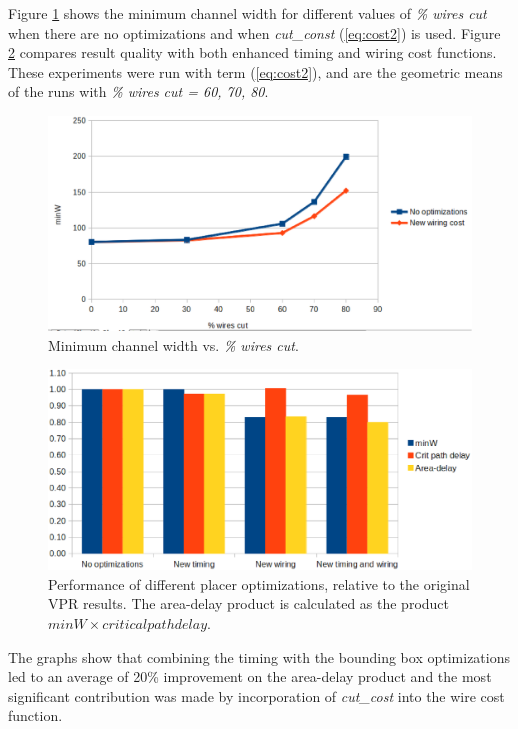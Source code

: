 \documentclass{sig-alternate-2013}
\begin{document}
Figure \ref{fig:comparison_minW} shows the minimum channel width for different values of \textit{\% wires cut} when there are no optimizations and when \textit{cut\_const} (\ref{eq:cost2}) is used. %
Figure \ref{fig:comparison_bars} compares result quality with both enhanced timing and wiring cost functions. These experiments were run with term (\ref{eq:cost2}), and are the geometric means of the runs with \textit{\% wires cut = 60, 70, 80}. 

\begin{figure}[!htbp]
\centering
\includegraphics[width=\linewidth]{comparison_minW.eps}
\caption{Minimum channel width vs. \textit{\% wires cut}.}
\label{fig:comparison_minW}
\end{figure}

\begin{figure}[!htbp]
\centering
\includegraphics[width=\linewidth]{comparison_bars_relative.eps}
\caption{Performance of different placer optimizations, relative to the original VPR results. The area-delay product is calculated as the product $minW \times critical path delay.$}
\label{fig:comparison_bars}
\end{figure}

The graphs show that combining the timing with the bounding box optimizations led to an average of 20\% improvement on the area-delay product and the most significant contribution was made by incorporation of \textit{cut\_cost} into the wire cost function.
\end{document}
